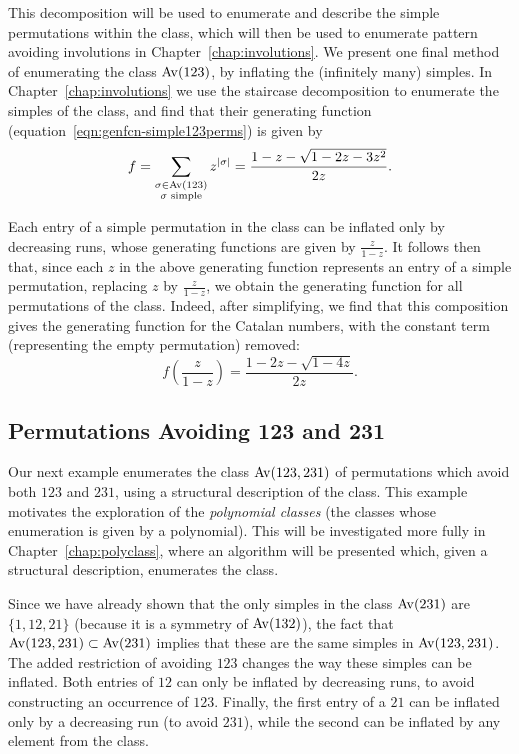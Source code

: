     This decomposition will be used to enumerate and describe the simple
    permutations within the class, which will then be used to enumerate pattern
    avoiding involutions in Chapter~\ref{chap:involutions}. 
    We present one final method of enumerating the class $\operatorname{{Av}}(123)$, by
    inflating the (infinitely many) simples. In Chapter~\ref{chap:involutions}
    we use the staircase decomposition to enumerate the simples of the class,
    and find that their generating function
    (equation~\ref{eqn:genfcn-simple123perms}) is given by 
    $$ f = \sum_{\substack{ \sigma \in \operatorname{{Av}}(123) \\ \sigma \text{ simple}}}
        z^{|\sigma|} = \frac{1 - z - \sqrt{1 - 2z - 3z^2}}{2z} .$$

    Each entry of a simple permutation in the class can be inflated only by
    decreasing runs, whose generating functions are given by $\frac{z}{1-z}$.
    It follows then that, since each $z$ in the above generating function
    represents an entry of a simple permutation, replacing $z$ by
    $\frac{z}{1-z}$, we obtain the generating function for all permutations of
    the class. Indeed, after simplifying, we find that this composition gives
    the generating function for the Catalan numbers, with the constant term
    (representing the empty permutation) removed: 
    $$ f\left(\frac{z}{1-z}\right) = \frac{1 - 2z - \sqrt{1-4z}}{2z}.$$



  \subsection{Permutations Avoiding 123 and 231}
  \label{prelim:sec:av123+231}

    Our next example enumerates the class $\operatorname{{Av}}(123, 231)$ of
    permutations which avoid both $123$ and $231$, using a structural
    description of the class. This example motivates the exploration of the
    \emph{polynomial classes} (the classes whose enumeration is given by a
    polynomial). This will be investigated more fully in
    Chapter~\ref{chap:polyclass}, where an algorithm will be presented which,
    given a structural description, enumerates the class. 

    Since we have already shown that the only simples in the class $\operatorname{{Av}} (231)$
    are $\{1, 12, 21\}$ (because it is a symmetry of $\operatorname{{Av}}(132)$), the fact that
    $\operatorname{{Av}}(123, 231) \subset \operatorname{{Av}}(231)$ implies that these are the same simples in
    $\operatorname{{Av}}(123, 231)$. The added restriction of avoiding $123$ changes the way
    these simples can be inflated. Both entries of $12$ can only be inflated by
    decreasing runs, to avoid constructing an occurrence of $123$. Finally, the
    first entry of a $21$ can be inflated only by a decreasing run (to avoid
    $231$), while the second can be inflated by any element from the class. 
    
